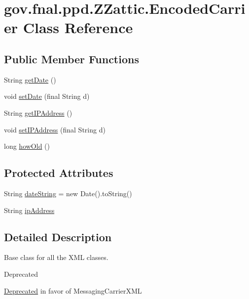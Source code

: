 \hypertarget{classgov_1_1fnal_1_1ppd_1_1ZZattic_1_1EncodedCarrier}{\section{gov.\-fnal.\-ppd.\-Z\-Zattic.\-Encoded\-Carrier Class Reference}
\label{classgov_1_1fnal_1_1ppd_1_1ZZattic_1_1EncodedCarrier}
}
\subsection*{Public Member Functions}
\begin{DoxyCompactItemize}
\item 
String \hyperlink{classgov_1_1fnal_1_1ppd_1_1ZZattic_1_1EncodedCarrier_a78d0cd10e1a13e78e697e6559b265aa5}{get\-Date} ()
\item 
void \hyperlink{classgov_1_1fnal_1_1ppd_1_1ZZattic_1_1EncodedCarrier_aec293d5ce2d9ca7c8c13091085c4cad8}{set\-Date} (final String d)
\item 
String \hyperlink{classgov_1_1fnal_1_1ppd_1_1ZZattic_1_1EncodedCarrier_a099c08a698c6dad95fe960430c7d24e2}{get\-I\-P\-Address} ()
\item 
void \hyperlink{classgov_1_1fnal_1_1ppd_1_1ZZattic_1_1EncodedCarrier_aeddf788b5506883bd7398d45f2115497}{set\-I\-P\-Address} (final String d)
\item 
long \hyperlink{classgov_1_1fnal_1_1ppd_1_1ZZattic_1_1EncodedCarrier_ab4252d10a9b8b817738c26305dc0fa23}{how\-Old} ()
\end{DoxyCompactItemize}
\subsection*{Protected Attributes}
\begin{DoxyCompactItemize}
\item 
String \hyperlink{classgov_1_1fnal_1_1ppd_1_1ZZattic_1_1EncodedCarrier_a52e1a21b7119b6db2906234788c669ac}{date\-String} = new Date().to\-String()
\item 
String \hyperlink{classgov_1_1fnal_1_1ppd_1_1ZZattic_1_1EncodedCarrier_a92ce35341bcff56215a1541d67eeb04a}{ip\-Address}
\end{DoxyCompactItemize}


\subsection{Detailed Description}
Base class for all the X\-M\-L classes. \begin{DoxyRefDesc}{Deprecated}
\item[\hyperlink{deprecated__deprecated000013}{Deprecated}]in favor of Messaging\-Carrier\-X\-M\-L\end{DoxyRefDesc}


